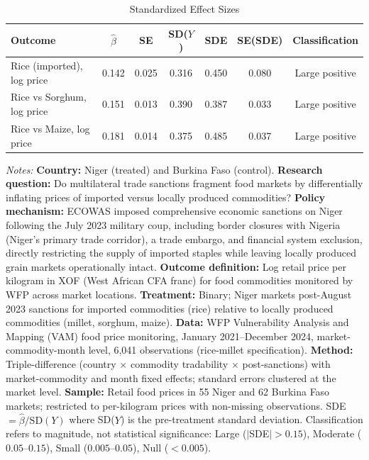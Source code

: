 \begin{table}[htbp]
\centering
\caption{Standardized Effect Sizes}
\label{tab:sde}
\small
\begin{tabular}{lcccccc}
\toprule
Outcome & $\hat{\beta}$ & SE & SD($Y$) & SDE & SE(SDE) & Classification \\
\midrule
Rice (imported), log price & 0.142 & 0.025 & 0.316 & 0.450 & 0.080 & Large positive \\
Rice vs Sorghum, log price & 0.151 & 0.013 & 0.390 & 0.387 & 0.033 & Large positive \\
Rice vs Maize, log price & 0.181 & 0.014 & 0.375 & 0.485 & 0.037 & Large positive \\
\bottomrule
\end{tabular}
\begin{tablenotes}
\item \textit{Notes:} \textbf{Country:} Niger (treated) and Burkina Faso (control). \textbf{Research question:} Do multilateral trade sanctions fragment food markets by differentially inflating prices of imported versus locally produced commodities? \textbf{Policy mechanism:} ECOWAS imposed comprehensive economic sanctions on Niger following the July 2023 military coup, including border closures with Nigeria (Niger's primary trade corridor), a trade embargo, and financial system exclusion, directly restricting the supply of imported staples while leaving locally produced grain markets operationally intact. \textbf{Outcome definition:} Log retail price per kilogram in XOF (West African CFA franc) for food commodities monitored by WFP across market locations. \textbf{Treatment:} Binary; Niger markets post-August 2023 sanctions for imported commodities (rice) relative to locally produced commodities (millet, sorghum, maize). \textbf{Data:} WFP Vulnerability Analysis and Mapping (VAM) food price monitoring, January 2021--December 2024, market-commodity-month level, 6,041 observations (rice-millet specification). \textbf{Method:} Triple-difference (country $\times$ commodity tradability $\times$ post-sanctions) with market-commodity and month fixed effects; standard errors clustered at the market level. \textbf{Sample:} Retail food prices in 55 Niger and 62 Burkina Faso markets; restricted to per-kilogram prices with non-missing observations. SDE $= \hat{\beta} / \text{SD}(Y)$ where SD($Y$) is the pre-treatment standard deviation. Classification refers to magnitude, not statistical significance: Large ($|$SDE$| > 0.15$), Moderate ($0.05$--$0.15$), Small ($0.005$--$0.05$), Null ($< 0.005$).
\end{tablenotes}
\end{table}
